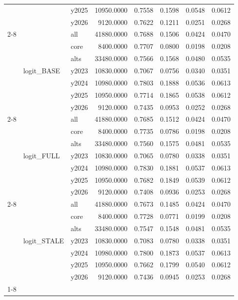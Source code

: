 \begin{tabular}{lllrrrrr}
 &  & y2025 & 10950.0000 & 0.7558 & 0.1598 & 0.0548 & 0.0612 \\
 &  & y2026 & 9120.0000 & 0.7622 & 0.1211 & 0.0251 & 0.0268 \\
\cline{2-8}
 & \multirow[t]{7}{*}{logit_BASE} & all & 41880.0000 & 0.7688 & 0.1506 & 0.0424 & 0.0470 \\
 &  & core & 8400.0000 & 0.7707 & 0.0800 & 0.0198 & 0.0208 \\
 &  & alts & 33480.0000 & 0.7566 & 0.1568 & 0.0480 & 0.0535 \\
 &  & y2023 & 10830.0000 & 0.7067 & 0.0756 & 0.0340 & 0.0351 \\
 &  & y2024 & 10980.0000 & 0.7803 & 0.1888 & 0.0536 & 0.0613 \\
 &  & y2025 & 10950.0000 & 0.7714 & 0.1865 & 0.0538 & 0.0612 \\
 &  & y2026 & 9120.0000 & 0.7435 & 0.0953 & 0.0252 & 0.0268 \\
\cline{2-8}
 & \multirow[t]{7}{*}{logit_FULL} & all & 41880.0000 & 0.7685 & 0.1512 & 0.0424 & 0.0470 \\
 &  & core & 8400.0000 & 0.7735 & 0.0786 & 0.0198 & 0.0208 \\
 &  & alts & 33480.0000 & 0.7560 & 0.1575 & 0.0481 & 0.0535 \\
 &  & y2023 & 10830.0000 & 0.7065 & 0.0780 & 0.0338 & 0.0351 \\
 &  & y2024 & 10980.0000 & 0.7830 & 0.1881 & 0.0537 & 0.0613 \\
 &  & y2025 & 10950.0000 & 0.7682 & 0.1849 & 0.0539 & 0.0612 \\
 &  & y2026 & 9120.0000 & 0.7408 & 0.0936 & 0.0253 & 0.0268 \\
\cline{2-8}
 & \multirow[t]{7}{*}{logit_STALE} & all & 41880.0000 & 0.7673 & 0.1485 & 0.0424 & 0.0470 \\
 &  & core & 8400.0000 & 0.7728 & 0.0771 & 0.0199 & 0.0208 \\
 &  & alts & 33480.0000 & 0.7547 & 0.1548 & 0.0481 & 0.0535 \\
 &  & y2023 & 10830.0000 & 0.7083 & 0.0780 & 0.0338 & 0.0351 \\
 &  & y2024 & 10980.0000 & 0.7800 & 0.1873 & 0.0537 & 0.0613 \\
 &  & y2025 & 10950.0000 & 0.7662 & 0.1799 & 0.0540 & 0.0612 \\
 &  & y2026 & 9120.0000 & 0.7436 & 0.0945 & 0.0253 & 0.0268 \\
\cline{1-8} \cline{2-8}
\bottomrule
\end{tabular}

